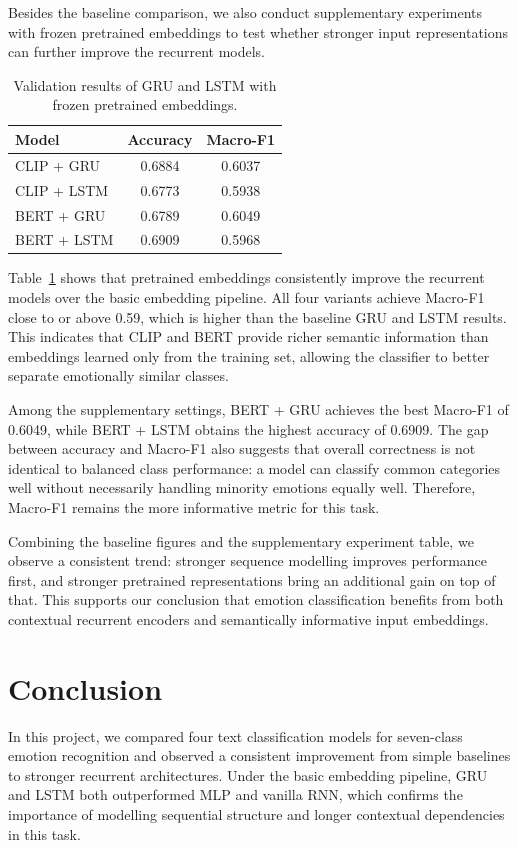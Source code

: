 \documentclass[10pt,twocolumn,letterpaper]{article}
\begin{document}
\noindent Besides the baseline comparison, we also conduct supplementary experiments with frozen pretrained embeddings to test whether stronger input representations can further improve the recurrent models.

\begin{table}[t]
\centering
\begin{tabular}{lcc}
\hline
Model & Accuracy & Macro-F1 \\
\hline
CLIP + GRU  & 0.6884 & 0.6037 \\
CLIP + LSTM & 0.6773 & 0.5938 \\
BERT + GRU  & 0.6789 & 0.6049 \\
BERT + LSTM & 0.6909 & 0.5968 \\
\hline
\end{tabular}
\caption{Validation results of GRU and LSTM with frozen pretrained embeddings.}
\label{tab:pretrained-results}
\end{table}

\noindent Table~\ref{tab:pretrained-results} shows that pretrained embeddings consistently improve the recurrent models over the basic embedding pipeline. All four variants achieve Macro-F1 close to or above 0.59, which is higher than the baseline GRU and LSTM results. This indicates that CLIP and BERT provide richer semantic information than embeddings learned only from the training set, allowing the classifier to better separate emotionally similar classes.

\noindent Among the supplementary settings, BERT + GRU achieves the best Macro-F1 of 0.6049, while BERT + LSTM obtains the highest accuracy of 0.6909. The gap between accuracy and Macro-F1 also suggests that overall correctness is not identical to balanced class performance: a model can classify common categories well without necessarily handling minority emotions equally well. Therefore, Macro-F1 remains the more informative metric for this task.

\noindent Combining the baseline figures and the supplementary experiment table, we observe a consistent trend: stronger sequence modelling improves performance first, and stronger pretrained representations bring an additional gain on top of that. This supports our conclusion that emotion classification benefits from both contextual recurrent encoders and semantically informative input embeddings.

\section{Conclusion}
\noindent In this project, we compared four text classification models for seven-class emotion recognition and observed a consistent improvement from simple baselines to stronger recurrent architectures. Under the basic embedding pipeline, GRU and LSTM both outperformed MLP and vanilla RNN, which confirms the importance of modelling sequential structure and longer contextual dependencies in this task.
\end{document}

